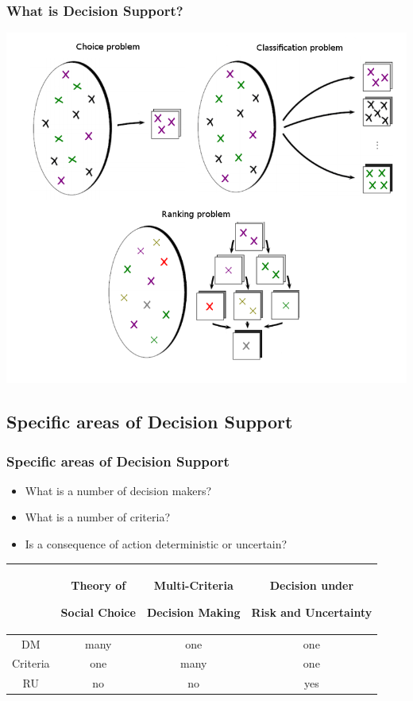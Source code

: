 \documentclass{beamer}
\begin{document}
\begin{frame}
\frametitle{What is Decision Support?}
\begin{center}
\includegraphics[scale=0.34]{problems.png}
\end{center}
\end{frame}


\subsection{Specific areas of Decision Support}
\begin{frame}
\frametitle{Specific areas of Decision Support}
\begin{itemize}
\item What is a number of decision makers?
\item What is a number of criteria?
\item Is a consequence of action deterministic or uncertain?
\end{itemize}
\begin{table}
\begin{tabular}{c|c|c|c}
    &\parbox[t]{2.3cm}{Theory of \par Social Choice \strut} & \parbox[t]{2.8cm}{Multi-Criteria \par Decision Making\strut} & \parbox[t]{4.1cm}{Decision under \par Risk and Uncertainty\strut} \\
    \hline
    DM & many & one & one \\
    \hline
    Criteria & one & many & one \\
    \hline
    RU & no & no & yes\\
    \hline

\end{tabular}
\end{table}
\end{frame}
\end{document}
